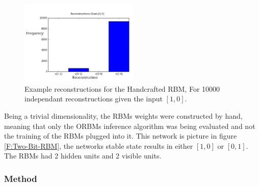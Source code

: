 \begin{figure}
  \begin{center}
    \includegraphics[width=0.5\textwidth]{Assets/Two-Bit-RBM-Recon.png}
  \end{center}
  \caption{Example reconstructions for the Handcrafted RBM, For 10000 independant reconstructions given the input $[1,0]$.}
  \label{F:Two-Bit-RBM-Recons}
\end{figure}


Being a trivial dimensionality, the RBMs weights were constructed by hand, meaning that only the ORBMs inference algorithm was being evaluated and not the training of the RBMs plugged into it. This network is picture in figure \ref{F:Two-Bit-RBM},  the networks stable state results in either $[1 , 0]$ or $[0 , 1]$. The RBMs had 2 hidden units and 2 visible units.

\subsubsection{Method}

